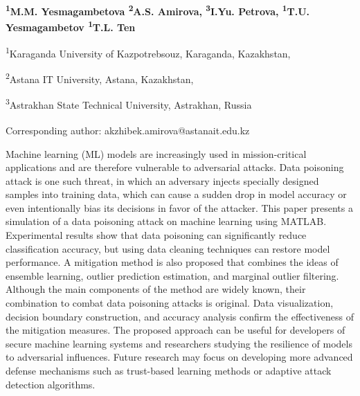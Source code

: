 
\begin{articleheader}

{\bfseries
\textsuperscript{1}M.M. Yesmagambetova
\textsuperscript{2}A.S. Amirova\textsuperscript{\envelope },
\textsuperscript{3}I.Yu. Petrova,
\textsuperscript{1}T.U. Yesmagambetov
\textsuperscript{1}T.L. Ten
}
\end{articleheader}

\begin{affiliation}
\textsuperscript{1}Karaganda University of Kazpotrebsouz, Karaganda, Kazakhstan,

\textsuperscript{2}Astana IT University, Astana, Kazakhstan,

\textsuperscript{3}Astrakhan State Technical University, Astrakhan, Russia

\raggedright \textsuperscript{\envelope }Corresponding author: akzhibek.amirova@astanait.edu.kz
\end{affiliation}

Machine learning (ML) models are increasingly used in mission-critical
applications and are therefore vulnerable to adversarial attacks. Data
poisoning attack is one such threat, in which an adversary injects
specially designed samples into training data, which can cause a sudden
drop in model accuracy or even intentionally bias its decisions in favor
of the attacker. This paper presents a simulation of a data poisoning
attack on machine learning using MATLAB. Experimental results show that
data poisoning can significantly reduce classification accuracy, but
using data cleaning techniques can restore model performance. A
mitigation method is also proposed that combines the ideas of ensemble
learning, outlier prediction estimation, and marginal outlier filtering.
Although the main components of the method are widely known, their
combination to combat data poisoning attacks is original. Data
visualization, decision boundary construction, and accuracy analysis
confirm the effectiveness of the mitigation measures. The proposed
approach can be useful for developers of secure machine learning systems
and researchers studying the resilience of models to adversarial
influences. Future research may focus on developing more advanced
defense mechanisms such as trust-based learning methods or adaptive
attack detection algorithms.

